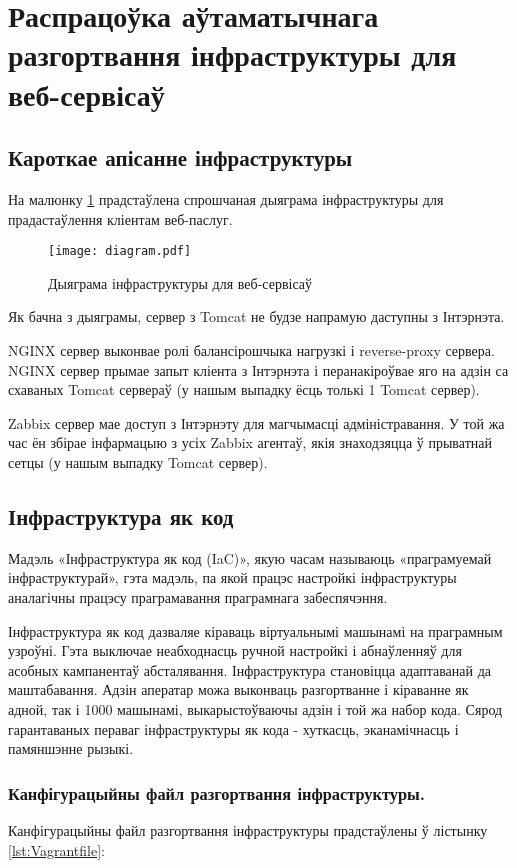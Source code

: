 \section{Распрацоўка аўтаматычнага разгортвання інфраструктуры для веб-сервісаў}

\subsection{Кароткае апісанне інфраструктуры}
На малюнку \ref{figure:diagram} прадстаўлена спрошчаная дыяграма інфраструктуры
для прадастаўлення кліентам веб-паслуг.

\begin{figure}[h!]
    \centering
    \texttt{[image: diagram.pdf]}
    \caption{Дыяграма інфраструктуры для веб-сервісаў}
    \label{figure:diagram} 
\end{figure}

Як бачна з дыяграмы, сервер з Tomcat не будзе напрамую даступны з Інтэрнэта.

NGINX сервер выконвае ролі балансірошчыка нагрузкі і reverse-proxy сервера.
NGINX сервер прымае запыт кліента з Інтэрнэта і перанакіроўвае яго на
адзін са схаваных Tomcat сервераў (у нашым выпадку ёсць толькі 1 Tomcat сервер).

Zabbix сервер мае доступ з Інтэрнэту для магчымасці адміністравання.
У той жа час ён збірае інфармацыю з усіх Zabbix агентаў, якія знаходзяцца ў
прыватнай сетцы (у нашым выпадку Tomcat сервер).

\subsection{Інфраструктура як код}
Мадэль «Інфраструктура як код (IaC)», якую часам называюць «праграмуемай інфраструктурай», гэта мадэль, па якой працэс настройкі інфраструктуры аналагічны працэсу праграмавання праграмнага забеспячэння.

Інфраструктура як код дазваляе кіраваць віртуальнымі машынамі на праграмным узроўні. Гэта выключае неабходнасць ручной настройкі і абнаўленняў для асобных кампанентаў абсталявання. Інфраструктура становіцца адаптаванай да маштабавання. Адзін аператар можа выконваць разгортванне і кіраванне як адной, так і 1000 машынамі, выкарыстоўваючы адзін і той жа набор кода. Сярод гарантаваных пераваг інфраструктуры як кода - хуткасць, эканамічнасць і памяншэнне рызыкі.

\subsubsection{Канфігурацыйны файл разгортвання інфраструктуры.}
Канфігурацыйны файл разгортвання інфраструктуры прадстаўлены ў лістынку
\ref{lst:Vagrantfile}:

